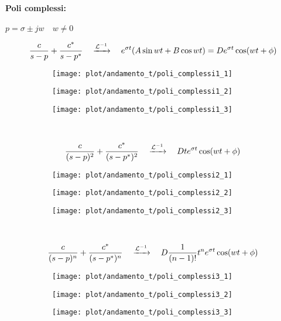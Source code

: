 \documentclass[../main.tex]{subfiles}
\begin{document}
	\paragraph{Poli complessi:} $ p = \sigma \pm jw \quad w \neq 0 $
	\begin{figure}[h!]
		\[ \frac{c}{s-p} + \frac{c^*}{s-p^*}  \quad \xrightarrow{\mathcal{L}^{-1}} \quad  e^{\sigma t} (A \sin wt + B \cos wt) = D e^{\sigma t} \cos (wt + \phi)  \]
		\centering
		\begin{subfigure}{0.3\textwidth}
			\texttt{[image: plot/andamento\_t/poli\_complessi1\_1]}
		\end{subfigure}
		\begin{subfigure}{0.3\textwidth}
			\texttt{[image: plot/andamento\_t/poli\_complessi1\_2]}
		\end{subfigure}
		\begin{subfigure}{0.3\textwidth}
			\texttt{[image: plot/andamento\_t/poli\_complessi1\_3]}
		\end{subfigure}
	\end{figure}\\
	\begin{figure}[h!]
		\[ \frac{c}{(s-p)^2} + \frac{c^*}{(s-p^*)^2}  \quad \xrightarrow{\mathcal{L}^{-1}} \quad  D t e^{\sigma t} \cos (wt + \phi) \]
		\centering
		\begin{subfigure}{0.3\textwidth}
			\texttt{[image: plot/andamento\_t/poli\_complessi2\_1]}
		\end{subfigure}
		\begin{subfigure}{0.3\textwidth}
			\texttt{[image: plot/andamento\_t/poli\_complessi2\_2]}
		\end{subfigure}
		\begin{subfigure}{0.3\textwidth}
			\texttt{[image: plot/andamento\_t/poli\_complessi2\_3]}
		\end{subfigure}
	\end{figure}\\
	\begin{figure}[h!]
		\[ \frac{c}{(s-p)^n} + \frac{c^*}{(s-p^*)^n}  \quad \xrightarrow{\mathcal{L}^{-1}} \quad  D \frac{1}{(n-1)!} t^n e^{\sigma t} \cos (wt + \phi) \]
		\centering
		\begin{subfigure}{0.3\textwidth}
			\texttt{[image: plot/andamento\_t/poli\_complessi3\_1]}
		\end{subfigure}
		\begin{subfigure}{0.3\textwidth}
			\texttt{[image: plot/andamento\_t/poli\_complessi3\_2]}
		\end{subfigure}
		\begin{subfigure}{0.3\textwidth}
			\texttt{[image: plot/andamento\_t/poli\_complessi3\_3]}
		\end{subfigure}
	\end{figure}
\end{document}
